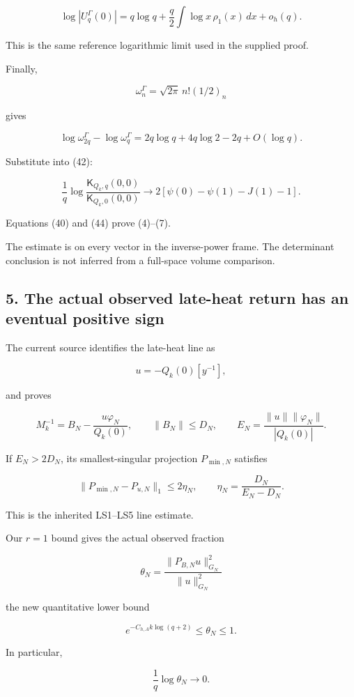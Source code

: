 \documentclass[11pt]{article}
\begin{document}
\[
\log|U_q^\Gamma(0)|
=
q\log q+\frac q2\int\log x\,\rho_1(x)\,dx+o_h(q).
\]

This is the same reference logarithmic limit used in the supplied proof.

Finally,

\[
\omega_n^\Gamma=\sqrt{2\pi}\,n!(1/2)_n
\]

gives

\[
\log\omega_{2q}^\Gamma-\log\omega_q^\Gamma
=
2q\log q+4q\log2-2q+O(\log q).
\]

Substitute into (42):

\[
\boxed{
\frac1q\log
\frac{\mathsf K_{Q_k,q}(0,0)}
{\mathsf K_{Q_k,0}(0,0)}
\longrightarrow
2[\psi(0)-\psi(1)-J(1)-1].
}
\tag{44}
\]

Equations (40) and (44) prove (4)--(7).

The estimate is on every vector in the inverse-power frame. The determinant conclusion is not inferred from a full-space volume comparison.

\subsection{5. The actual observed late-heat return has an eventual positive sign}\label{the-actual-observed-late-heat-return-has-an-eventual-positive-sign}

The current source identifies the late-heat line as

\[
u=-Q_k(0)[y^{-1}],
\]

and proves

\[
M_k^{-1}=B_N-\frac{u\varphi_N}{Q_k(0)},
\qquad
\|B_N\|\le D_N,
\qquad
E_N=\frac{\|u\|\|\varphi_N\|}{|Q_k(0)|}.
\]

If \(E_N>2D_N\), its smallest-singular projection \(P_{\min,N}\) satisfies

\[
\|P_{\min,N}-P_{u,N}\|_1
\le2\eta_N,\qquad
\eta_N=\frac{D_N}{E_N-D_N}.
\]

This is the inherited LS1--LS5 line estimate.

Our \(r=1\) bound gives the actual observed fraction

\[
\theta_N=
\frac{\|P_{B,N}u\|_{G_N}^2}{\|u\|_{G_N}^2}
\]

the new quantitative lower bound

\[
\boxed{
e^{-C_{h,A}k\log(q+2)}
\le\theta_N\le1.
}
\tag{45}
\]

In particular,

\[
\boxed{\frac1q\log\theta_N\longrightarrow0.}
\tag{46}
\]
\end{document}
